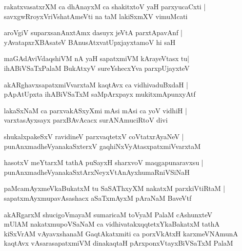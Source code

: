 \documentclass[twoside,12pt,openright]{book}
\newcounter{shloka}[chapter]
\begin{document}
\begin{shloka}%
rakatxvasatxrXM ca dhAnayxM ca shakitxtoV yaH parxyucaCxti |\\
savxgwRroyxVriVshatAmeVti na taM lakiSxmXV vimuMcati 
\end{shloka}

\begin{shloka}%
aroVgiV suparxsanAnxtAmx dasuyx jeVtA parxtApavAnf |\\
yAvatapxrXBAsateV BAnusAtxvatUpxjayxtamoV hi saH 
\end{shloka}

\begin{shloka}%
maGAdAviVdaqshiVM nA yaH sapatxmiVM kArayeVtasx tu|\\
ihABiVSaTxPalaM BukAtxyV sureYshecxYva parxpUjayxteV 
\end{shloka}

\begin{shloka}%
akARghavxsapatxmiVvarxtaM kaqtAvx ca vidhivaduBxdaH |\\
pApAtUpxta ihABiVSaTxM saMpArxpayx mukitxmApunxyAtf 
\end{shloka}

\begin{shloka}%
lakaSxNaM ca parxvakASxyXmi mAsi mAsi ca yoV vidhiH |\\
varxtasAyxsayx parxBAvAcacx surANAmuciRtoV divi
\end{shloka}

\begin{shloka}%
shukalxpakeSxV ravidineV parxvaqtetxV coVtatxrAyaNeV |\\
punAnxmadheVyanakaSxterxV gaqhiNxVyAtasxpatxmiVvarxtaM 
\end{shloka}

\begin{shloka}%
hasotxV meYtarxM tathA puSayxH sharxvoV maqgapunaravxsu |\\
punAnxmadheVyanakaSxtArxNeyxVtAnAyxhumaRniVSiNaH 
\end{shloka}

\begin{shloka}%
paMcamAyxmeVkaBukatxM tu SaSAThxyXM nakatxM parxkiVtiRtaM |\\
sapatxmAyxmupavAsashacx aSaTxmAyxM pAraNaM BaveVtf
\end{shloka}

\begin{shloka}%
akARgarxM shucigoVmayaM sumaricaM toVyaM PalaM cAshunxteV \\
mUlAM nakatxmupoVSaNaM ca vidhivatakxqqtetxYkaBakatxM tathA \\
kiSxVrAM vAyavxshanaM GaqtAkatxmiti ca porxVkAtxH karxmeVNAmunA \\
kaqtAvx vAsarasapatxmiVM dinakaqtaH pArxponxVtayxBiVSaTxM PalaM 
\end{shloka}
\end{document}
